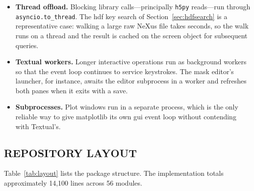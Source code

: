 \documentclass[tm]{ornltm}
\begin{document}
\begin{itemize}
  \item \textbf{Thread offload.} Blocking library calls---principally
    \texttt{h5py} reads---run through \texttt{asyncio.to\_thread}. The \ac{hdf}
    key search of Section~\ref{sec:hdfsearch} is a representative case: walking a
    large raw NeXus file takes seconds, so the walk runs on a thread and the
    result is cached on the screen object for subsequent queries.
  \item \textbf{Textual workers.} Longer interactive operations run as
    background workers so that the event loop continues to service keystrokes.
    The mask editor's launcher, for instance, awaits the editor subprocess in a
    worker and refreshes both panes when it exits with a save.
  \item \textbf{Subprocesses.} Plot windows run in a separate process, which
    is the only reliable way to give matplotlib its own \ac{gui} event loop
    without contending with Textual's.
\end{itemize}

\subsection{REPOSITORY LAYOUT}

Table~\ref{tab:layout} lists the package structure. The implementation totals
approximately 14,100 lines across 56 modules.
\end{document}
